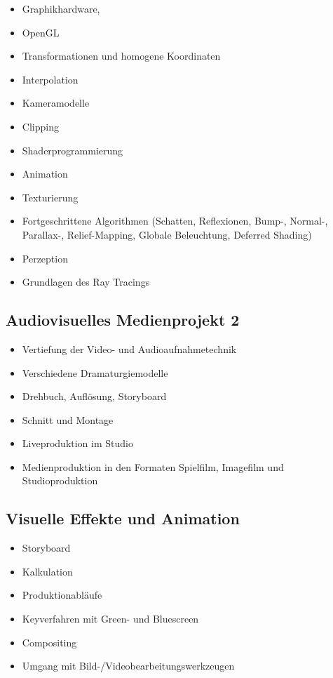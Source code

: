 \begin{itemize}
\item
  Graphikhardware,
\item
  OpenGL
\item
  Transformationen und homogene Koordinaten
\item
  Interpolation
\item
  Kameramodelle
\item
  Clipping
\item
  Shaderprogrammierung
\item
  Animation
\item
  Texturierung
\item
  Fortgeschrittene Algorithmen (Schatten, Reflexionen, Bump-, Normal-,
  Parallax-, Relief-Mapping, Globale Beleuchtung, Deferred Shading)
\item
  Perzeption
\item
  Grundlagen des Ray Tracings
\end{itemize}

\subsection*{Audiovisuelles Medienprojekt
2}\label{audiovisuelles-medienprojekt-2-1}

\begin{itemize}
\item
  Vertiefung der Video- und Audioaufnahmetechnik
\item
  Verschiedene Dramaturgiemodelle
\item
  Drehbuch, Auflösung, Storyboard
\item
  Schnitt und Montage
\item
  Liveproduktion im Studio
\item
  Medienproduktion in den Formaten Spielfilm, Imagefilm und
  Studioproduktion
\end{itemize}

\subsection*{Visuelle Effekte und
Animation}\label{visuelle-effekte-und-animation-1}

\begin{itemize}
\item
  Storyboard
\item
  Kalkulation
\item
  Produktionabläufe
\item
  Keyverfahren mit Green- und Bluescreen
\item
  Compositing
\item
  Umgang mit Bild-/Videobearbeitungswerkzeugen
\end{itemize}

